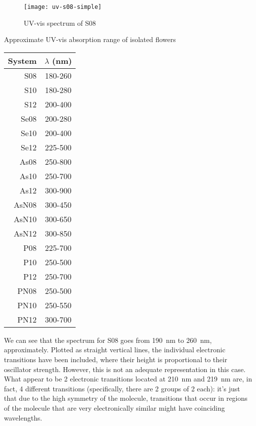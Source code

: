 \begin{figure}[h]
    \texttt{[image: uv-s08-simple]}
    \caption[UV-vis spectrum of S08]{UV-vis spectrum of S08}
\end{figure}

\begin{margintable}
    \centering
    \caption[UV-vis absorption range of isolated flowers]{Approximate UV-vis absorption range of isolated flowers}
    \begin{tabular}{@{}rc@{}}
        \toprule
        System & $\lambda$ (\si{\nano\metre}) \\
        \midrule
        S08 & 180-260 \\
        S10 & 180-280 \\
        S12 & 200-400 \\
        Se08 & 200-280 \\
        Se10 & 200-400 \\
        Se12 & 225-500 \\
        As08 & 250-800 \\
        As10 & 250-700 \\
        As12 & 300-900 \\
        AsN08 & 300-450 \\
        AsN10 & 300-650 \\
        AsN12 & 300-850 \\
        P08 & 225-700 \\
        P10 & 250-500 \\
        P12 & 250-700 \\
        PN08 & 250-500 \\
        PN10 & 250-550 \\
        PN12 & 300-700 \\
    \end{tabular}
\end{margintable}

We can see that the spectrum for S08 goes from \SI{190}{\nano\metre} to \SI{260}{\nano\metre}, approximately.
Plotted as straight vertical lines, the individual electronic transitions have been included, where their height is proportional to their oscillator strength.
However, this is not an adequate representation in this case.
What appear to be 2 electronic transitions located at \SI{210}{\nano\metre} and \SI{219}{\nano\metre} are, in fact, 4 different transitions (specifically, there are 2 groups of 2 each): it's just that due to the high symmetry of the molecule, transitions that occur in regions of the molecule that are very electronically similar might have coinciding wavelengths.

